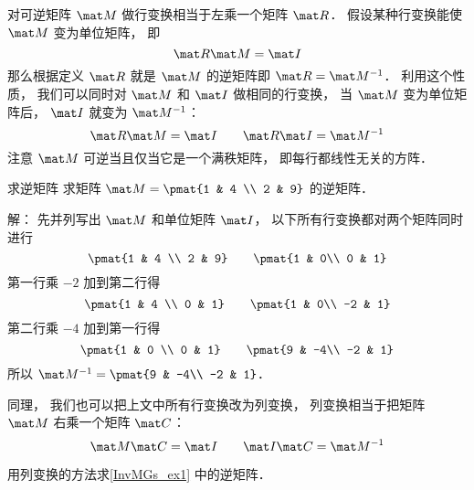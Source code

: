 

对可逆矩阵 $\mat M$ 做行变换相当于左乘一个矩阵 $\mat R$． 假设某种行变换能使 $\mat M$ 变为单位矩阵， 即
\begin{equation}
\mat R \mat M = \mat I
\end{equation}
那么根据定义 $\mat R$ 就是 $\mat M$ 的逆矩阵即 $\mat R = \mat M^{-1}$． 利用这个性质， 我们可以同时对 $\mat M$ 和 $\mat I$ 做相同的行变换， 当 $\mat M$ 变为单位矩阵后， $\mat I$ 就变为 $\mat M^{-1}$：
\begin{equation}
\mat R\mat M = \mat I
\qquad
\mat R \mat I = \mat M^{-1}
\end{equation}
注意 $\mat M$ 可逆当且仅当它是一个满秩矩阵， 即每行都线性无关的方阵．

\begin{example}{求逆矩阵}\label{InvMGs_ex1}
求矩阵 $\mat M = \pmat{1 & 4 \\ 2 & 9}$ 的逆矩阵．

解： 先并列写出 $\mat M$ 和单位矩阵 $\mat I$， 以下所有行变换都对两个矩阵同时进行
\begin{equation}
\pmat{1 & 4 \\ 2 & 9} \qquad \pmat{1 & 0\\ 0 & 1}
\end{equation}
第一行乘 $-2$ 加到第二行得
\begin{equation}
\pmat{1 & 4 \\ 0 & 1} \qquad \pmat{1 & 0\\ -2 & 1}
\end{equation}
第二行乘 $-4$ 加到第一行得
\begin{equation}
\pmat{1 & 0 \\ 0 & 1} \qquad \pmat{9 & -4\\ -2 & 1}
\end{equation}
所以 $\mat M^{-1} = \pmat{9 & -4\\ -2 & 1}$．
\end{example}

同理， 我们也可以把上文中所有行变换改为列变换， 列变换相当于把矩阵 $\mat M$ 右乘一个矩阵 $\mat C$：
\begin{equation}
\mat M\mat C = \mat I
\qquad
\mat I\mat C = \mat M^{-1}
\end{equation}
\begin{exercise}{}
用列变换的方法求\autoref{InvMGs_ex1} 中的逆矩阵．
\end{exercise}
